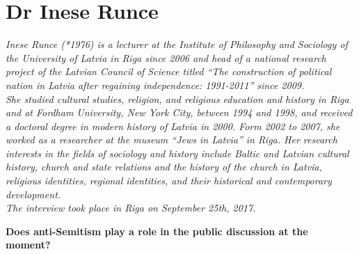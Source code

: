 \section{Dr Inese Runce}

\textit{Inese Runce (*1976) is a lecturer at the Institute of Philosophy and Sociology of the University of Latvia in Riga since 2006 and head of a national research project of the Latvian  Council of Science titled ``The construction  of political nation in Latvia after regaining independence: 1991-2011'' since 2009.\\
She studied cultural studies, religion, and religious education and history in Riga and at Fordham University, New York City, between 1994 and 1998, and received a doctoral degree in modern history of Latvia in 2000. Form 2002 to 2007, she worked as a researcher at the museum ``Jews in Latvia'' in Riga. Her research interests in the fields of sociology and history include Baltic and Latvian cultural history, church and state relations and the history of the church in Latvia, religious identities, regional identities, and their historical and contemporary development.\\
The interview took place in Riga on September 25th, 2017.}\par
\vspace*{2em}

\textbf{Does anti-Semitism play a role in the public discussion at the moment?}

